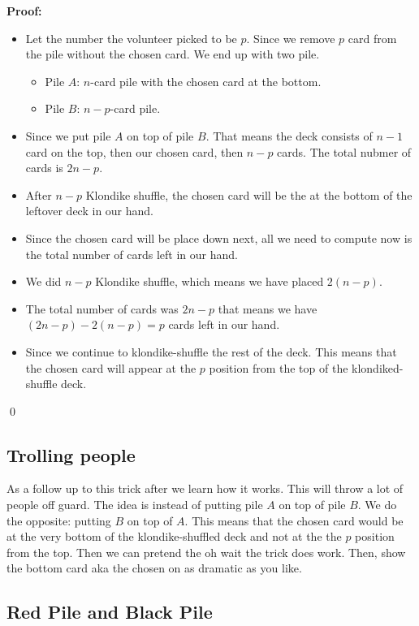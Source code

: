 \documentclass[a4paper, 12pt]{article}
\renewcommand{\proof}{\noindent\textbf{Proof:} }
\newcommand{\qedd}{\qed\newline}
\theoremstyle{examplestyle}
\begin{document}
\begin{multicols}{2}
\proof 
\begin{itemize}
	\item Let the number the volunteer picked to be $p$. Since we remove $p$ card from the pile without the chosen card. We end up with two pile.
		\begin{itemize}
			\item Pile $A$: $n$-card pile with the chosen card at the bottom.
			\item Pile $B$: $n-p$-card pile.
		\end{itemize}
	\item Since we put pile $A$ on top of pile $B$. That means the deck consists of $n-1$ card on the top, then our chosen card, then $n-p$ cards. The total nubmer of cards is $2n-p$.
	\item After $n-p$ Klondike shuffle, the chosen card will be the at the bottom of the leftover deck in our hand. 
	\item Since the chosen card will be place down next, all we need to compute now is the total number of cards left in our hand.
	\item We did $n-p$ Klondike shuffle, which means we have placed $2(n-p)$.
	\item The total number of cards was $2n-p$ that means we have $(2n-p) - 2(n-p) = p$ cards left in our hand.
	\item Since we continue to klondike-shuffle the rest of the deck. This means that the chosen card will appear at the $p$ position from the top of the klondiked-shuffle deck.
\end{itemize}
\qedd

\subsection*{Trolling people}

As a follow up to this trick after we learn how it works. This will throw a lot of people off guard. The idea is instead of putting pile $A$ on top of pile $B$. We do the opposite: putting $B$ on top of $A$. This means that the chosen card would be at the very bottom of the klondike-shuffled deck and not at the the $p$ position from the top. Then we can pretend the oh wait the trick does work. Then, show the bottom card aka the chosen on as dramatic as you like.

\subsection*{Red Pile and Black Pile}


\end{multicols}
\end{document}
